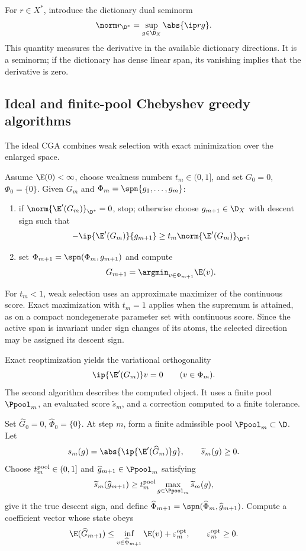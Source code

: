 For \(r\in X^*\), introduce the dictionary dual seminorm
\[
  \norm r_{\D^*}=\sup_{g\in\D_X}\abs{\ip r g}.
\]
This quantity measures the derivative in the available dictionary directions. It is a seminorm;
if the dictionary has dense linear span, its vanishing implies that the derivative is zero.

\subsection{Ideal and finite-pool Chebyshev greedy algorithms}

The ideal CGA combines weak selection with exact minimization over the enlarged space.

\begin{algorithm}[htbp]
\caption{Continuous weak Chebyshev greedy algorithm}
\label{alg:continuous}
Assume \(\E(0)<\infty\), choose weakness numbers \(t_m\in(0,1]\), and set
\(G_0=0\), \(\Phi_0=\{0\}\). Given
\(G_m\) and \(\Phi_m=\spn\{g_1,\ldots,g_m\}\):
\begin{enumerate}[label=\textup{(\roman*)}]
  \item if \(\norm{\E'(G_m)}_{\D^*}=0\), stop; otherwise choose \(g_{m+1}\in\D_X\) with descent sign such that
  \[
  -\ip{\E'(G_m)}{g_{m+1}}
  \geq t_m\norm{\E'(G_m)}_{\D^*};
  \]
  \item set \(\Phi_{m+1}=\spn(\Phi_m,g_{m+1})\) and compute
  \[
    G_{m+1}=\argmin_{v\in\Phi_{m+1}}\E(v).
  \]
\end{enumerate}
\end{algorithm}

For \(t_m<1\), weak selection uses an approximate maximizer of the continuous score. Exact maximization with \(t_m=1\) applies when the supremum is attained, as on a compact nondegenerate parameter set with continuous score. Since the active span is invariant under sign changes of its atoms, the selected direction may be assigned its descent sign.

Exact reoptimization yields the variational orthogonality
\begin{equation}
 \ip{\E'(G_m)}v=0\qquad(v\in\Phi_m).
 \label{eq:orthogonality}
\end{equation}
The second algorithm describes the computed object. It uses a finite pool \(\Ppool_m\), an evaluated
score \(\widetilde s_m\), and a correction computed to a finite tolerance.

\begin{algorithm}[htbp]
\caption{Finite-pool inexact CGA}
\label{alg:finite}
Set \(\widehat G_0=0\), \(\widehat\Phi_0=\{0\}\). At step \(m\), form a finite admissible pool
\(\Ppool_m\subset\D\). Let
\[
 s_m(g)=\abs{\ip{\E'(\widehat G_m)}g},
 \qquad \widetilde s_m(g)\geq0.
\]
Choose \(t_m^{\rm pool}\in(0,1]\) and \(\widehat g_{m+1}\in\Ppool_m\) satisfying
\[
 \widetilde s_m(\widehat g_{m+1})
 \geq t_m^{\rm pool}\max_{g\in\Ppool_m}\widetilde s_m(g),
\]
give it the true descent sign, and define
\(\widehat\Phi_{m+1}=\spn(\widehat\Phi_m,\widehat g_{m+1})\). Compute a coefficient vector whose state
obeys
\[
 \E(\widehat G_{m+1})
 \leq\inf_{v\in\widehat\Phi_{m+1}}\E(v)+\varepsilon_m^{\rm opt},
 \qquad \varepsilon_m^{\rm opt}\geq0.
\]
\end{algorithm}

